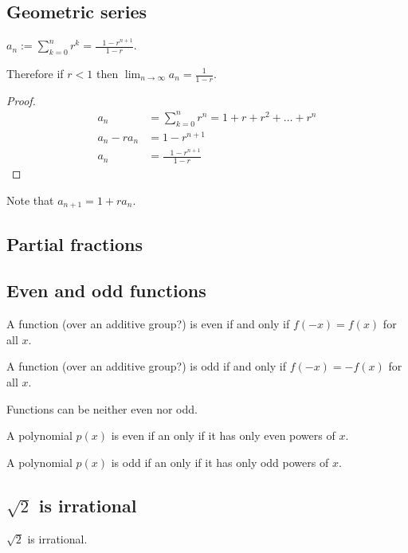 \subsection{Geometric series}
\begin{theorem*}
  $a_n := \sum_{k=0}^nr^k = \frac{~~~~1 - r^{n+1}}{1 - r}$.

  Therefore if $r < 1$ then $\lim_{n \to \infty} a_n = \frac{1}{1 - r}$.
\end{theorem*}
\begin{proof}
  \begin{align*}
    a_n          &= \sum_{k=0}^nr^n = 1 + r + r^2 + \ldots + r^n\\
    a_n - ra_n  &= 1 - r^{n+1}\\
    a_n          &= \frac{~~~~1 - r^{n+1}}{1 - r}
  \end{align*}
\end{proof}
\begin{remark*}
  Note that $a_{n+1} = 1 + ra_n$.
\end{remark*}

\subsection{Partial fractions}


\subsection{Even and odd functions}

\begin{definition*}
  A function (over an additive group?) is even if and only if $f(-x) = f(x)$ for all $x$.

  A function (over an additive group?) is odd if and only if $f(-x) = -f(x)$ for all $x$.
\end{definition*}

Functions can be neither even nor odd.

\begin{claim*}
  A polynomial $p(x)$ is even if an only if it has only even powers of $x$.

  A polynomial $p(x)$ is odd if an only if it has only odd powers of $x$.
\end{claim*}

\subsection{$\sqrt{2}$ is irrational}
\begin{theorem*}
  $\sqrt{2}$ is irrational.
\end{theorem*}

